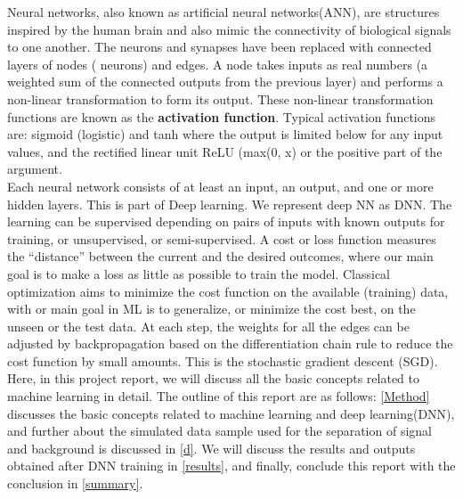 Neural networks, also known as artificial neural networks(ANN), are structures inspired by the human brain and also mimic the connectivity of biological signals to one another. The neurons and synapses have been replaced with connected layers of
nodes ( neurons) and edges. A node takes inputs as real numbers (a weighted sum of the connected outputs from the previous layer) and performs a non-linear transformation to form its output. These non-linear transformation functions are known as the \textbf{activation function}. Typical activation functions are: sigmoid (logistic) and tanh where the output is limited below  %
for any input values, and the rectified linear unit ReLU (max(0, x) or the positive part of the argument.\\
Each  neural network consists of at least an input, an output, and one or more hidden layers. This is part of Deep learning. We represent deep NN as DNN. The learning can be supervised depending on pairs of inputs with known outputs for training, or unsupervised, or semi-supervised. A cost or loss function measures the “distance” between the current and the desired outcomes, where our main goal is to make a loss as little as possible to train the model. Classical optimization aims to minimize the cost function on the available (training) data, with or main goal in ML is to generalize, or minimize the cost best, on the unseen or the test data. At each step, the weights for all the edges can be adjusted by backpropagation based on the differentiation chain rule to reduce the cost function by small amounts. This is the stochastic gradient descent (SGD)\cite{4}.\\

Here, in this project report, we will discuss all the basic concepts related to machine learning in detail. The outline of this report are as follows: \autoref{Method}  discusses the basic concepts related to machine learning and deep learning(DNN), and further about the simulated data sample used for the separation of signal and background is discussed in \autoref{d}. We will discuss the results and outputs obtained after DNN training in \autoref{results}, and finally, conclude this report with the conclusion in \autoref{summary}. 


\setcounter{equation}{0}
\setcounter{table}{0}
\setcounter{figure}{0}


    



